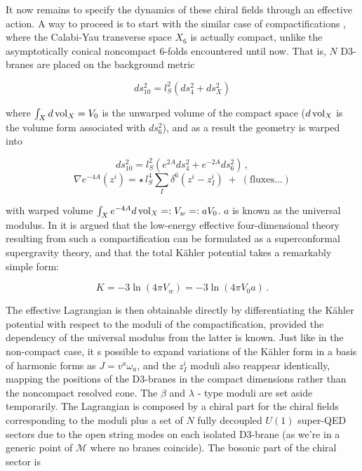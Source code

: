 It now remains to specify the dynamics of these chiral fields through an effective action. A way to proceed is to start with the similar case of compactifications \cite{MZ_2}, where the Calabi-Yau transverse space $X_6$ is actually compact, unlike the asymptotically conical noncompact 6-folds encountered until now. That is, $N$ D3-branes are placed on the background metric

\begin{equation}
	ds_{10}^2 = l_S^2 (ds^2_4 + ds^2_X)
	\label{}
\end{equation}

where $\int_X d\operatorname{vol}_X = V_0$ is the unwarped volume of the compact space ($d\operatorname{vol}_X$ is the volume form associated with $ds_6^2$), and as a result the geometry is warped into

\begin{equation}
	ds_{10}^2 = l_S^2 ( e^{2A} ds^2_4 + e^{-2A} ds^2_6 )\,,
\end{equation}
\begin{equation}
	\nabla e^{-4A}(z^i) = \star \, l_S^4 \sum_I \delta^6(z^i - z_I^i) \; + \; (\text {fluxes}\ldots)
	\label{}
\end{equation}

with warped volume $\int_X e^{-4A} d\operatorname{vol}_X =: V_w =: a V_0$. $a$ is known as the universal modulus. In \cite{MZ_2} it is argued that the low-energy effective four-dimensional theory resulting from such a compactification can be formulated as a superconformal supergravity theory, and that the total K\"ahler potential takes a remarkably simple form:

\begin{equation}
	K = -3 \ln(4\pi V_w) = -3 \ln(4 \pi V_0 a)\,.
	\label{warpedkahler}
\end{equation}

The effective Lagrangian is then obtainable directly by differentiating the K\"ahler potential with respect to the moduli of the compactification, provided the dependency of the universal modulus from the latter is known. Just like in the non-compact case, it s possible to expand variations of the K\"ahler form in a basis of harmonic forms as $J = v^a \omega_a$, and the $z_I^i$ moduli also reappear identically, mapping the positions of the D3-branes in the compact dimensions rather than the noncompact resolved cone. The $\beta$ and $\lambda$ - type moduli are set aside temporarily. The Lagrangian is composed by a chiral part for the chiral fields corresponding to the moduli plus a set of $N$ fully decoupled $U(1)$ super-QED sectors due to the open string modes on each isolated D3-brane (as we're in a generic point of $\mathcal{M}$ where no branes coincide). The bosonic part of the chiral sector is

